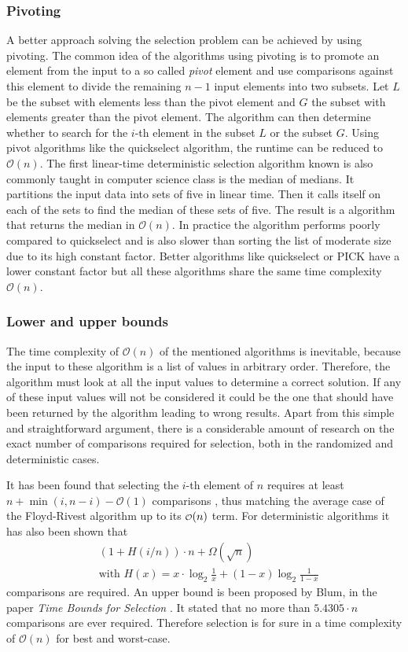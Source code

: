 \documentclass[10pt,journal,compsoc]{IEEEtran}
\newcommand\smallO{
  \mathchoice
    {{\scriptstyle\mathcal{O}}}%
    {{\scriptstyle\mathcal{O}}}%
    {{\scriptscriptstyle\mathcal{O}}}%
    {\scalebox{.50}{$\scriptscriptstyle\mathcal{O}$}}%
  }
\begin{document}
\subsubsection{Pivoting}
A better approach solving the selection problem can be achieved by using
pivoting. The common idea of the algorithms using pivoting is to promote an
element from the input to a so called \textit{pivot} element and use comparisons
against this element to divide the remaining $n - 1$ input elements into two
subsets. Let $L$ be the subset with elements less than the pivot element and $G$
the subset with elements greater than the pivot element. The algorithm can then
determine whether to search for the $i$-th element in the subset $L$ or the
subset $G$. Using pivot algorithms like the quickselect algorithm, the runtime
can be reduced to $\mathcal{O}(n)$.
The first linear-time deterministic selection algorithm known is also commonly
taught in computer science class is the median of medians. It partitions the
input data into sets of five in linear time. Then it calls itself on each of the
sets to find the median of these sets of five. The result is a algorithm that
returns the median in $\mathcal{O}(n)$. In practice the algorithm performs
poorly compared to quickselect and is also slower than sorting the list of
moderate size due to its high constant factor. Better algorithms like
quickselect or PICK have a lower constant factor but all these algorithms share
the same time complexity $\mathcal{O}(n)$. \cite{Blum1972, HoareQuickselect}

\subsubsection{Lower and upper bounds}
The time complexity of $\mathcal{O}(n)$ of the mentioned algorithms is
inevitable, because the input to these algorithm is a list of values in
arbitrary order. Therefore, the algorithm must look at all the input values to
determine a correct solution. If any of these input values will not be
considered it could be the one that should have been returned by the algorithm
leading to wrong results. Apart from this simple and straightforward argument,
there is a considerable amount of research on the exact number of comparisons
required for selection, both in the randomized and deterministic cases.

It has been found that selecting the $i$-th element of $n$ requires at least
$n+\min(i,n-i)-\mathcal{O}(1)$ comparisons \cite{cunto1989}, thus matching the
average case of the Floyd-Rivest algorithm up to its $\smallO(n)$ term. For
deterministic algorithms it has also been shown that
\begin{eqnarray*}
  &\left (1 + H(i/n) \right ) \cdot n + \Omega(\sqrt n) \\
  &\text{with~} H(x) = x \cdot \log_2 \frac{1}{x} + (1-x) \log_2 \frac{1}{1-x}
\end{eqnarray*}
comparisons are required. An upper bound is been proposed by Blum, in the paper
\textit{Time Bounds for Selection} \cite{Blum1972}. It stated that no more than
$5.430\dot{5} \cdot n$ comparisons are ever required. Therefore
selection is for sure in a time complexity of $\mathcal{O}(n)$ for best and
worst-case.
\end{document}

